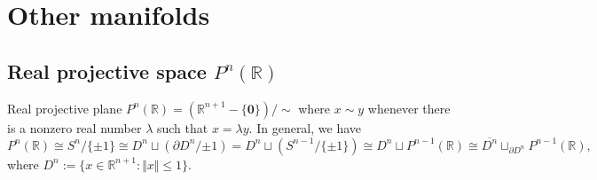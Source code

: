 \documentclass{report}
\theoremstyle{nonumberplain}
\begin{document}
\section{Other manifolds}
\subsection{Real projective space $P^n(\mathbb{R})$}
Real projective plane $P^n(\mathbb{R})=(\mathbb{R}^{n+1}-\{\mathbf{0}\})/\sim$ where $x\sim y$ whenever there is a nonzero real number $\lambda$ such that $x = \lambda y$. In general, we have 
$$
P^n(\mathbb{R})\cong S^n/\{\pm 1\}\cong D^n\sqcup (\partial D^n/{\pm 1})= D^n\sqcup (S^{n-1}/\{\pm 1\})\cong D^n\sqcup P^{n-1}(\mathbb{R})\cong \overline{D^n}\sqcup_{\partial D^n} P^{n-1}(\mathbb{R}),
$$
where $D^n:=\{x\in\mathbb{R}^{n+1}:\Vert x\Vert\le1\}$. 
\end{document}
